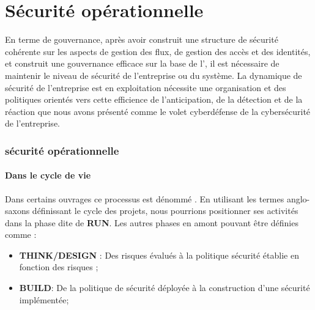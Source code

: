 %
%


\section{Sécurité opérationnelle}

En terme de gouvernance, après avoir construit une structure de sécurité cohérente sur les aspects de gestion des flux, de gestion des accès et des identités, et construit une gouvernance efficace sur la base de l', il est  nécessaire de maintenir le niveau de sécurité de l'entreprise ou du système. La dynamique de sécurité de l'entreprise est en exploitation nécessite une organisation et des politiques orientés vers cette efficience de l'anticipation, de la détection et de la réaction que nous avons présenté comme le volet cyberdéfense de la cybersécurité de l'entreprise.

\begin{frame}
\frametitle<presentation>{sécurité opérationnelle}
\framesubtitle<presentation>{Dans le cycle de vie}
Dans certains ouvrages ce processus est dénommé  . En utilisant  les termes anglo-saxons définissant le cycle des projets, nous pourrions positionner ses activités dans la phase dite de  \textbf{RUN}. Les autres phases en amont pouvant être définies comme : 

\begin{itemize}
 \item \textbf{THINK/DESIGN} : Des risques évalués à la politique sécurité établie en fonction des risques ;
 \item \textbf{BUILD}: De la politique de sécurité déployée à la construction d’une sécurité implémentée;
\end{itemize}
\end{frame}


